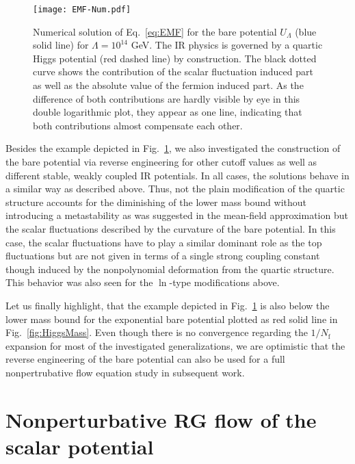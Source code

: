 \documentclass[twocolumn,aps,prd,showpacs,nofootinbib,superscriptaddress,preprintnumbers,floatfix,10pt]{revtex4-1}
\newcommand{\Nf}{N_{\mathrm{f}}}
\newcommand{\UL}{U_{\Lambda}}
\begin{document}
\begin{figure}[t!]
\centering
\texttt{[image: EMF-Num.pdf]}
\caption{Numerical solution of Eq.~\eqref{eq:EMF} for the bare potential $\UL$ (blue solid line) for $\Lambda = 10^{14}$ GeV. The IR physics is governed by a quartic Higgs potential (red dashed line) by construction. The black dotted curve shows the contribution of the scalar fluctuation induced part as well as the absolute value of the fermion induced part. As the difference of both contributions are hardly visible by eye in this double logarithmic plot, they appear as one line, indicating that both contributions almost compensate each other.}
\label{fig:EMFPot}
\end{figure}




Besides the example depicted in Fig.~\ref{fig:EMFPot}, we also investigated the construction of the bare potential via reverse engineering for other cutoff values as well as different stable, weakly coupled IR potentials. In all cases, the solutions behave in a similar way as described above. 
Thus, not the plain modification of the quartic structure accounts for the diminishing of the lower mass bound without introducing a metastability as was suggested in the mean-field approximation but the scalar fluctuations described by the curvature of the bare potential. 
In this case, the scalar fluctuations have to play a similar dominant role as the top fluctuations but are not given in terms of a single strong coupling constant though induced by the nonpolynomial deformation from the quartic structure. 
This behavior was also seen for the $\ln$-type modifications above. 

Let us finally highlight, that the example depicted in Fig.~\ref{fig:EMFPot} is also below the lower mass bound for the exponential bare potential plotted as red solid line in Fig.~\ref{fig:HiggsMass}. Even though there is no convergence regarding the $1/\Nf$ expansion for most of the investigated generalizations, we are optimistic that the reverse engineering of the bare potential can also be used for a full nonpertrubative flow equation study in subsequent work.

 















\section{Nonperturbative RG flow of the scalar potential}
\label{sec:Flow}
\end{document}
